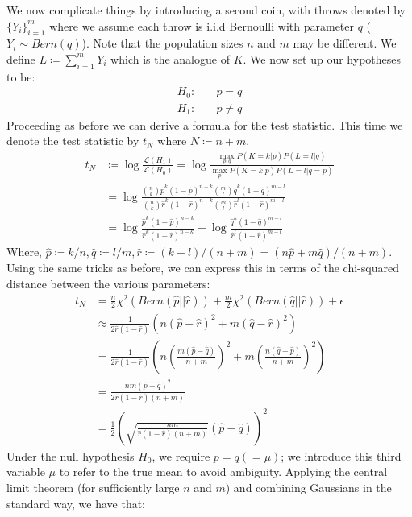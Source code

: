 \documentclass[]{article}
\newcommand{\lik}{\mathcal{L}}
\begin{document}
We now complicate things by introducing a second coin, with throws denoted by $\{Y_i\}_{i=1}^{m}$ where we assume each throw is i.i.d Bernoulli with parameter $q$ ($Y_i \sim Bern(q)$). Note that the population sizes $n$ and $m$ may be different. We define $L \coloneqq \sum_{i=1}^{m} Y_i$ which is the analogue of $K$. We now set up our hypotheses to be:
%
\begin{align*}
H_0:& \quad p = q \\
H_1:& \quad p \neq q
\end{align*}
%
Proceeding as before we can derive a formula for the test statistic. This time we denote the test statistic by $t_N$ where $N \coloneqq n + m$.
%
\begin{align*}
t_N &\coloneqq \log \frac{\lik(H_1)}{\lik(H_0)}
= \log \frac{\max_{p,q} P(K=k|p) P(L=l|q)}{\max_p P(K=k|p) P(L=l|q=p)} \\
&= \log \frac
{\binom{n}{k} \hat{p}^k (1 - \hat{p})^{n-k} \binom{m}{l} \hat{q}^k (1 - \hat{q})^{m-l}}
{\binom{n}{k} \hat{r}^k (1 - \hat{r})^{n-k} \binom{m}{l} \hat{r}^l (1 - \hat{r})^{m-l}} \\
&= \log \frac
{ \hat{p}^k (1 - \hat{p})^{n-k}}
{ \hat{r}^k (1 - \hat{r})^{n-k}}
+ \log \frac{\hat{q}^k (1 - \hat{q})^{m-l}}{ \hat{r}^l (1 - \hat{r})^{m-l}}
\end{align*} 
%
Where, $\hat{p} \coloneqq k/n, \hat{q} \coloneqq l/m, \hat{r} \coloneqq (k+l)/(n+m) = (n\hat{p} + m\hat{q})/(n+m)$. Using the same tricks as before, we can express this in terms of the chi-squared distance between the various parameters:
%
\begin{align*}
t_N &= \frac{n}{2} \chi^2\left(Bern(\hat{p}||\hat{r})\right)
+ \frac{m}{2} \chi^2\left(Bern(\hat{q}||\hat{r})\right)
+ \epsilon \\
&\approx \frac{1}{2\hat{r}(1-\hat{r})} \left(
n(\hat{p} - \hat{r})^2 + m(\hat{q} - \hat{r})^2
\right) \\
&= \frac{1}{2\hat{r}(1-\hat{r})} \left(
n\left( \frac{m(\hat{p} - \hat{q})}{n+m}\right)^2 + 
m\left( \frac{n(\hat{q} - \hat{p})}{n+m}\right)^2
\right) \\
&= \frac{nm(\hat{p} - \hat{q})^2}{2\hat{r}(1-\hat{r})(n+m)} \\
&= \frac{1}{2} \left( \sqrt{\frac{nm}{\hat{r}(1-\hat{r})(n+m)}} \left(\hat{p} - \hat{q}\right) \right)^2
\end{align*}
%
Under the null hypothesis $H_0$, we require $p=q(=\mu)$; we introduce this third variable $\mu$ to refer to the true mean to avoid ambiguity. Applying the central limit theorem (for sufficiently large $n$ and $m$) and combining Gaussians in the standard way, we have that:
\end{document}
